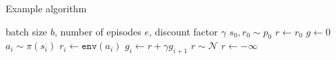 \documentclass{article}
\begin{document}
\begin{algorithm}
\caption{Example algorithm}\label{alg:example}
    \begin{algorithmic}[1]
        \Require batch size $b$, number of episodes $e$, discount factor $\gamma$
        \State $s_0, r_0 \sim p_0$
        \State $r \gets r_0$
        \State $g \gets 0$
             
                \State $a_i \sim \pi(s_i)$
                \State $r_i \gets \texttt{env}(a_i)$
            \EndFor
                \State $g_i \gets r + \gamma g_{i+1}$
                \State $r \sim \mathcal{N}$
            \EndWhile
        \Else
            \State $r \gets -\infty$
        \EndIf
    \end{algorithmic}
\end{algorithm}
\end{document}
